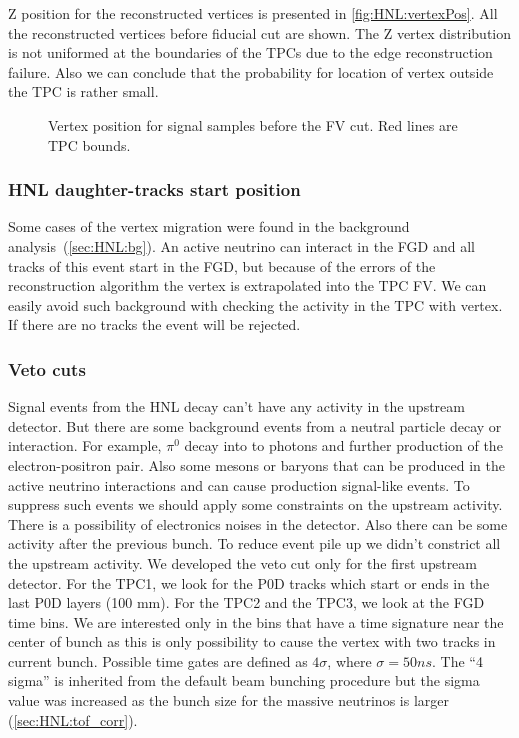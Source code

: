 \documentclass[../main.tex]{subfiles}
\begin{document}
Z position for the reconstructed vertices is presented in \autoref{fig:HNL:vertexPos}. All the reconstructed vertices before fiducial cut are shown. The Z vertex distribution is not uniformed at the boundaries of the TPCs due to the edge reconstruction failure. Also we can conclude that the probability for location of vertex outside the TPC is rather small.
\begin{figure}[!ht]
  \caption{Vertex position for signal samples before the FV cut. Red lines are TPC bounds.}
  \label{fig:HNL:vertexPos}
\end{figure}

\subsubsection{HNL daughter-tracks start position}
Some cases of the vertex migration were found in the background analysis~(\autoref{sec:HNL:bg}). An active neutrino can interact in the FGD and all tracks of this event start in the FGD, but because of the errors of the reconstruction algorithm the vertex is extrapolated into the TPC FV. We can easily avoid such background with checking the activity in the TPC with vertex. If there are no tracks the event will be rejected.

\subsubsection{Veto cuts}
Signal events from the HNL decay can't have any activity in the upstream detector. But there are some background events from a neutral particle decay or interaction. For example, $\pi^0$ decay into to photons and further production of the electron-positron pair. Also some mesons or baryons that can be produced in the active neutrino interactions and can cause production signal-like events. To suppress such events we should apply some constraints on the upstream activity. There is a possibility of electronics noises in the detector. Also there can be some activity after the previous bunch. To reduce event pile up we didn't constrict all the upstream activity. We developed the veto cut only for the first upstream detector. For the TPC1, we look for the P0D tracks which start or ends in the last P0D layers (100 mm). For the TPC2 and the  TPC3, we look at the FGD time bins. We are interested only in the bins that have a time signature near the center of bunch as this is only possibility to cause the vertex with two tracks in current bunch. Possible time gates are defined as $4\sigma$, where $\sigma=50ns$. The ``4 sigma'' is inherited from the default beam bunching procedure but the sigma value was increased as the bunch size for the massive neutrinos is larger (\autoref{sec:HNL:tof_corr}).
\end{document}
